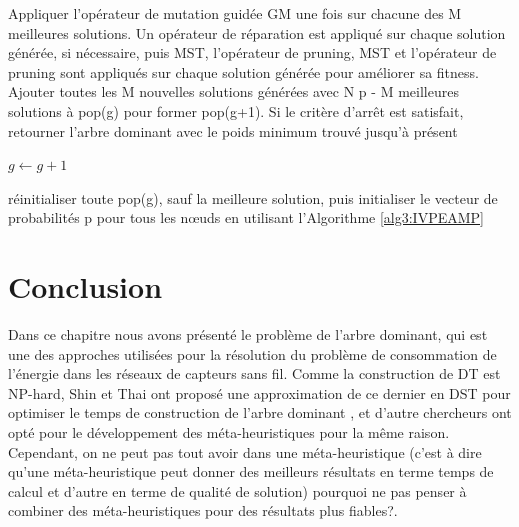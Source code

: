 \begin{enumerate}[label=\alph*)]
\begin{algorithm}[H]
{	Appliquer l’opérateur de mutation guidée GM une fois sur chacune des M meilleures
	solutions. Un opérateur de réparation est appliqué sur chaque solution générée, 		si nécessaire, puis MST, l’opérateur de pruning, MST et l’opérateur de pruning 			sont appliqués sur chaque solution générée pour améliorer sa fitness. Ajouter 			toutes les M nouvelles solutions générées avec N p - M meilleures solutions à 			pop(g) pour former pop(g+1). Si le critère d’arrêt est satisfait, retourner 			l’arbre dominant avec le poids minimum trouvé jusqu’à présent \;\;

	$ g \gets g + 1 $ \;

			{
		réinitialiser toute pop(g), sauf la meilleure solution, puis initialiser le 			vecteur de probabilités p pour tous les nœuds en utilisant l’Algorithme 				\ref{alg3:IVPEAMP}	
	}
	
}

\end{algorithm}


\end{enumerate}


\section{Conclusion}
Dans ce chapitre nous avons présenté le problème de l’arbre dominant, qui est une des approches utilisées pour la résolution du problème de consommation de l’énergie dans les réseaux de capteurs sans fil. Comme la construction de DT est NP-hard, Shin et Thai ont proposé une approximation de ce dernier en DST pour optimiser le temps de construction de l’arbre dominant \cite{shin2010approximation}, et d’autre chercheurs ont opté pour le développement des méta-heuristiques pour la même raison. Cependant, on ne peut pas tout avoir dans une méta-heuristique (c’est à dire qu’une méta-heuristique peut donner des meilleurs résultats en terme temps de calcul et d’autre en terme de qualité de solution) pourquoi ne pas penser à combiner des méta-heuristiques pour des résultats plus fiables?.

 